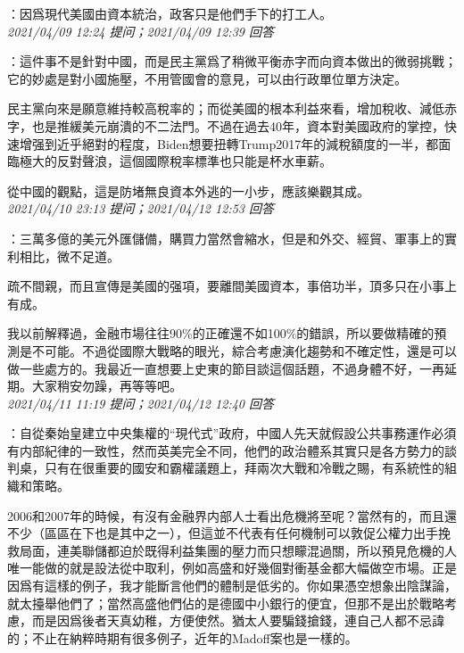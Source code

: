 \documentclass[twocolumn]{ctexart}
\begin{document}
：因爲現代美國由資本統治，政客只是他們手下的打工人。
\\

\textit{\hfill\noindent\small 2021/04/09 12:24 提问；2021/04/09 12:39 回答}

：這件事不是針對中國，而是民主黨爲了稍微平衡赤字而向資本做出的微弱挑戰；它的妙處是對小國施壓，不用管國會的意見，可以由行政單位單方決定。

民主黨向來是願意維持較高稅率的；而從美國的根本利益來看，增加稅收、減低赤字，也是推緩美元崩潰的不二法門。不過在過去40年，資本對美國政府的掌控，快速增强到近乎絕對的程度，Biden想要扭轉Trump2017年的減稅額度的一半，都面臨極大的反對聲浪，這個國際稅率標準也只能是杯水車薪。

從中國的觀點，這是防堵無良資本外逃的一小步，應該樂觀其成。
\\

\textit{\hfill\noindent\small 2021/04/10 23:13 提问；2021/04/12 12:53 回答}

：三萬多億的美元外匯儲備，購買力當然會縮水，但是和外交、經貿、軍事上的實利相比，微不足道。

疏不間親，而且宣傳是美國的强項，要離間美國資本，事倍功半，頂多只在小事上有成。

我以前解釋過，金融市場往往90\%的正確還不如100\%的錯誤，所以要做精確的預測是不可能。不過從國際大戰略的眼光，綜合考慮演化趨勢和不確定性，還是可以做一些處方的。我最近一直想要上史東的節目談這個話題，不過身體不好，一再延期。大家稍安勿躁，再等等吧。
\\

\textit{\hfill\noindent\small 2021/04/11 11:19 提问；2021/04/12 12:40 回答}

：自從秦始皇建立中央集權的“現代式”政府，中國人先天就假設公共事務運作必須有内部紀律的一致性，然而英美完全不同，他們的政治體系其實只是各方勢力的談判桌，只有在很重要的國安和霸權議題上，拜兩次大戰和冷戰之賜，有系統性的組織和策略。

2006和2007年的時候，有沒有金融界内部人士看出危機將至呢？當然有的，而且還不少（區區在下也是其中之一），但這並不代表有任何機制可以敦促公權力出手挽救局面，連美聯儲都迫於既得利益集團的壓力而只想矇混過關，所以預見危機的人唯一能做的就是設法從中取利，例如高盛和好幾個對衝基金都大幅做空市場。正是因爲有這樣的例子，我才能斷言他們的體制是低劣的。你如果憑空想象出陰謀論，就太擡舉他們了；當然高盛他們佔的是德國中小銀行的便宜，但那不是出於戰略考慮，而是因爲後者天真幼稚，方便使然。猶太人要騙錢搶錢，連自己人都不忌諱的；不止在納粹時期有很多例子，近年的Madoff案也是一樣的。
\\
\end{document}
